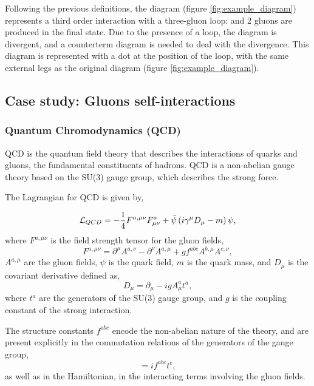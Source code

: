 \documentclass[11pt,a4paper,twoside,pdf]{article}
\numberwithin{equation}{section}
\begin{document}
Following the previous definitions, the diagram (figure \ref{fig:example_diagram}) represents
a third order interaction with a three-gluon loop: and 2 gluons are 
produced in the final state. Due to the presence of a loop, the diagram is
divergent, and a counterterm diagram is needed to deal with the divergence. This 
diagram is represented with a dot at the position of the loop, with the same 
external legs as the original diagram (figure \ref{fig:example_diagram}). 


\subsection{Case study: Gluons self-interactions} \label{sec:cases}

\subsubsection{Quantum Chromodynamics (QCD)}
QCD is the quantum field theory that describes the
interactions of quarks and gluons, the fundamental constituents of hadrons.
QCD is a non-abelian gauge theory based on the SU(3) gauge group, which describes
the strong force.

The Lagrangian for QCD is given by,

\begin{equation}
    \mathcal{L}_{QCD} = -\frac{1}{4} F^{a,\mu\nu} F^a_{\mu\nu} + \bar{\psi}
    \left( i\gamma^\mu D_\mu - m \right) \psi,
\label{eq:qcd_lagrangian}
\end{equation}
where \( F^{a,\mu\nu} \) is the field strength tensor for the gluon fields,
\begin{equation}
    F^{a,\mu\nu} = \partial^\mu A^{a,\nu} - \partial^\nu A^{a,\mu} + g f^{abc} A^{b,\mu} A^{c,\nu},
\end{equation}
\( A^{a,\mu} \) are the gluon fields, \( \psi \) is the quark field, \( m \) is the quark mass,
and \( D_\mu \) is the covariant derivative defined as,
\begin{equation}
    D_\mu = \partial_\mu - ig A^a_\mu t^a,
\end{equation}
where \( t^a \) are the generators of the SU(3) gauge group, and \( g \) is the
coupling constant of the strong interaction.

The structure constants \( f^{abc} \) encode the non-abelian nature of the
theory, and are present explicitly in the commutation relations of the
generators of the gauge group,
\begin{equation}
    [t^a, t^b] = i f^{abc} t^c,
\end{equation}
as well as in the Hamiltonian, in the interacting terms involving the gluon fields.
\end{document}
